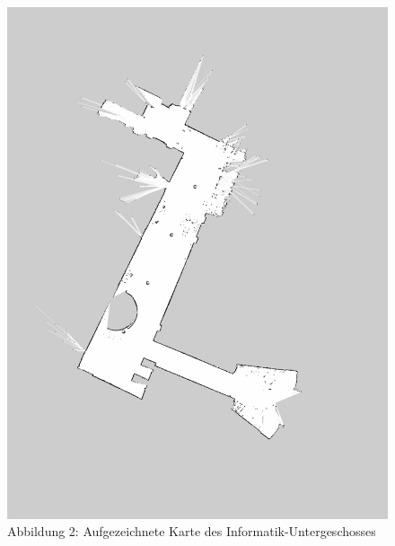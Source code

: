\documentclass[11pt,a4paper]{article}
\begin{document}
\begin{figure}[H]
  \caption*{Abbildung 2: Aufgezeichnete Karte des Informatik-Untergeschosses}
  \includegraphics[scale = 0.3, angle = 90]{map.pdf}
  \centering
\end{figure}

\end{document}
